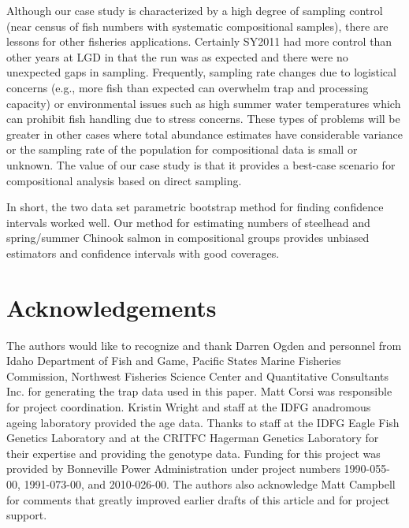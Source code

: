 \documentclass[%
                leqno,         %
%
]{nrc1}                          %
\begin{document}
Although our case study is characterized by a high degree of sampling control (near census of fish numbers with systematic compositional samples), there are lessons for other fisheries applications. Certainly SY2011 had more control than other years at LGD in that the run was as expected and there were no unexpected gaps in sampling. Frequently, sampling rate changes due to logistical concerns (e.g., more fish than expected can overwhelm trap and processing capacity) or environmental issues such as high summer water temperatures which can prohibit fish handling due to stress concerns. These types of problems will be greater in other cases where total abundance estimates have considerable variance or the sampling rate of the population for compositional data is small or unknown. The value of our case study is that it provides a best-case scenario for compositional analysis based on direct sampling.

In short, the two data set parametric bootstrap method for finding confidence intervals worked well. Our method for estimating numbers of steelhead and spring/summer Chinook salmon in compositional groups provides unbiased estimators and confidence intervals with good coverages.

\section*{Acknowledgements}
The authors would like to recognize and thank Darren Ogden and personnel from  Idaho Department of Fish and Game, Pacific States Marine Fisheries Commission, Northwest Fisheries Science Center and Quantitative Consultants Inc. for generating the trap data used in this paper. Matt Corsi was responsible for project coordination. Kristin Wright and staff at the IDFG anadromous ageing laboratory provided the age data. Thanks to staff at the IDFG Eagle Fish Genetics Laboratory and at the CRITFC Hagerman Genetics Laboratory for their expertise and providing the genotype data. Funding for this project was provided by Bonneville Power Administration under project numbers 1990-055-00, 1991-073-00, and 2010-026-00. The authors also acknowledge Matt Campbell for comments that greatly improved earlier drafts of this article and for project support.

%


\end{document}
